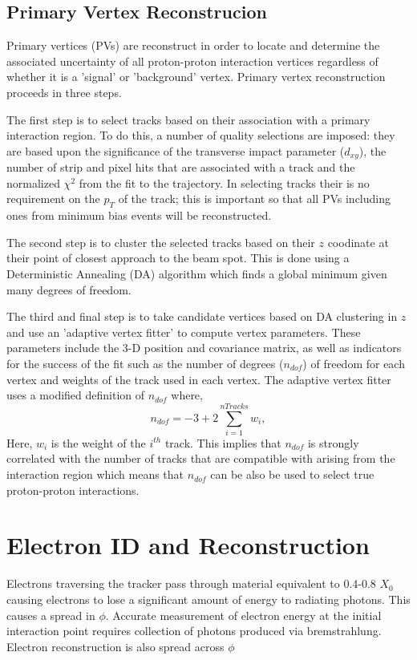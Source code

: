 \subsection{Primary Vertex Reconstrucion}
Primary vertices (PVs) are reconstruct in order to locate and determine the associated uncertainty of all
proton-proton interaction vertices regardless of whether it is a 'signal' or 'background' vertex.
Primary vertex reconstruction proceeds in three steps.

The first step is to select tracks based on their association with a primary interaction region.
To do this, a number of quality selections are imposed: they are based upon the significance of the
transverse impact parameter ($d_{xy}$), the number of strip and pixel hits that are 
associated with a track and the normalized $\chi^{2}$ from the fit to the
trajectory. In selecting tracks their is no requirement on the $p_{T}$ of the track; 
this is important so that all PVs including ones from minimum bias events will be reconstructed.

The second step is to cluster the selected tracks based on their $z$ coodinate at their
point of closest approach to the beam spot. This is done using a Deterministic Annealing (DA)
algorithm which finds a global minimum given many degrees of freedom.%

The third and final step is to take candidate vertices based on DA clustering in $z$ and use
an 'adaptive vertex fitter' %
to compute vertex parameters. These parameters include the 3-D position and covariance matrix,
as well as indicators for the success of the fit such as the number of degrees ($n_{dof}$) of freedom for
each vertex and weights of the track used in each vertex. The adaptive vertex fitter
uses a modified definition of $n_{dof}$ where,
\begin{equation}
n_{dof} = -3+2\sum^{nTracks}_{i=1} w_{i},
\end{equation}
Here, $w_{i}$ is the weight of the $i^{th}$ track. This implies that $n_{dof}$ is strongly
correlated with the number of tracks that are compatible with arising from the interaction
region which means that $n_{dof}$ can be also be used to select true proton-proton interactions.

\section{Electron ID and Reconstruction}
Electrons traversing the tracker pass through 
material equivalent to 0.4-0.8 $X_{0}$ %
causing electrons to lose a significant amount of 
energy to radiating photons. %
This causes a spread in $\phi$. %
Accurate measurement of electron energy 
at the initial interaction point
requires collection of photons produced via bremstrahlung.
Electron reconstruction is also spread across $\phi$

